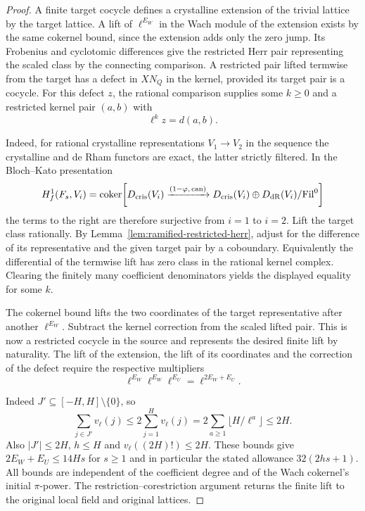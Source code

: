 \begin{proof}
A finite target cocycle defines a crystalline
extension of the trivial lattice by the target
lattice. A lift of \(\ell^{E_W}\) in the Wach module
of the extension exists by the same cokernel
bound, since the extension adds only the zero jump.
Its Frobenius and cyclotomic differences give the
restricted Herr pair representing the scaled
class by the connecting comparison.
A restricted pair lifted termwise from
the target has a defect in \(XN_Q\) in the kernel,
provided its target pair is a cocycle.
For this defect \(z\), the rational comparison supplies some \(k\ge0\) and a restricted kernel pair \((a,b)\) with
\[
 \ell^k z=d(a,b).
\]

Indeed, for rational crystalline representations \(V_1\to V_2\) in the sequence the crystalline and de Rham functors are exact, the latter strictly filtered. In the Bloch--Kato presentation
\[
 H^1_f(F_s,V_i)=\operatorname{coker}\!\left[
 D_{\rm cris}(V_i)\xrightarrow{(1-\varphi,\,\mathrm{can})}
 D_{\rm cris}(V_i)\oplus D_{\rm dR}(V_i)/\mathrm{Fil}^0\right]
\]
the terms to the right are therefore surjective from \(i=1\) to \(i=2\). Lift the target class rationally. By Lemma~\ref{lem:ramified-restricted-herr}, adjust for the difference of its representative and the given target pair by a coboundary. Equivalently the differential of the termwise lift has zero class in the rational kernel complex. Clearing the finitely many coefficient denominators yields the displayed equality for some \(k\). \cite[Section~3]{bloch-kato-finite}
\label{cor:full-cyclotomic-lifting-4}

The cokernel bound lifts the two coordinates
of the target representative after another
\(\ell^{E_W}\). Subtract the kernel correction
from the scaled lifted pair. This is now a
restricted cocycle in the source and represents
the desired finite lift by naturality.
The lift of the extension, the lift of its coordinates and the correction of the defect require the respective multipliers
\[
 \ell^{E_W}\ell^{E_W}\ell^{E_U}=\ell^{2E_W+E_U}.
\]

Indeed \(J'\subseteq[-H,H]\setminus\{0\}\), so
\[
 \sum_{j\in J'}v_\ell(j)
 \le 2\sum_{j=1}^H v_\ell(j)
 =2\sum_{a\ge1}\lfloor H/\ell^a\rfloor\le2H.
\]
Also \(|J'|\le 2H\), \(h\le H\) and
\(v_\ell((2H)!)\le2H\).
These bounds give \(2E_W+E_U\le14Hs\) for \(s\ge1\)
and in particular the stated allowance \(32(2hs+1)\).
All bounds are independent of the coefficient
degree and of the Wach cokernel's initial
\(\pi\)-power. The restriction--corestriction
argument returns the finite lift to the
original local field and original lattices.
\end{proof}

